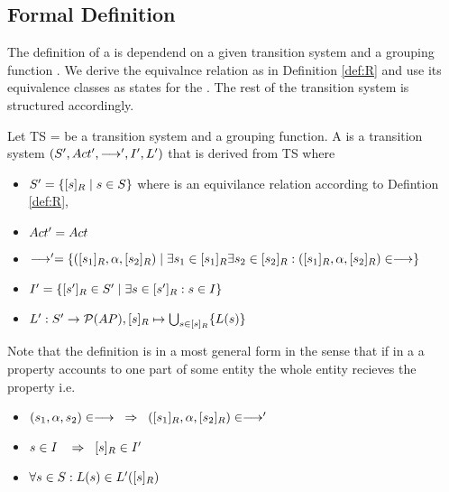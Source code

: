 \documentclass[preview]{standalone}
\begin{document}
	\subsection{Formal Definition}

The definition of a \viewN is dependend on a given transition system and a grouping function \grpfct. We derive the equivalnce relation \eqrelview as in Definition \ref{def:R} and use its equivalence classes  as states for the \viewN. The rest of the transition system is structured accordingly.


\begin{definition}
	
	Let TS = \transitionsystem be a transition system and \grpfct a grouping function. A \emph{\viewN} is a transition system $(S', Act',\longrightarrow', I', L')$ that is derived from TS where
	
	\begin{itemize}
		\item $S' = \{ [s]_{R} \mid s \in S \}$ where \eqrelview is an equivilance relation according to Defintion \ref{def:R},
		
		\item $Act' = Act$
		
		\item $\longrightarrow' = \{ ([s_1]_{R}, \alpha, [s_2]_{R}) \mid \exists s_1 \in [s_1]_{R} \exists s_2 \in [s_2]_{R} : ([s_1]_{R}, \alpha, [s_2]_{R}) \in \longrightarrow\}$%
		
		\item $I' = \{[s']_{R} \in S' \mid \exists s \in [s']_{R} : s \in I \}$
		
		\item $L': S' \rightarrow \mathcal{P}(AP), [s]_{R}\mapsto \bigcup_{s \in [s]_{R}} \{L(s)\}$
		
	\end{itemize}
	
\end{definition}

Note that the definition is in a most general form in the sense that if in a \viewN a property accounts to one part of some entity the whole entity recieves the property i.e. 
\begin{itemize}	
	\item $(s_1, \alpha, s_2) \in \longrightarrow \hspace{3mm}\Rightarrow\hspace{2mm} ([s_1]_{R}, \alpha, [s_2]_{R}) \in \longrightarrow'$
	\item $s \in I \hspace{3mm}\Rightarrow\hspace{2mm} [s]_{R} \in I'$
	\item $\forall s \in S : L(s) \in L'([s]_{R})$
\end{itemize}
\end{document}

